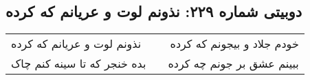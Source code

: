 \begin{center}
\section*{دوبیتی شماره ۲۲۹: نذونم لوت و عریانم که کرده}
\label{sec:229}
\begin{longtable}{l p{0.5cm} r}
نذونم لوت و عریانم که کرده
&&
خودم جلاد و بیجونم که کرده
\\
بده خنجر که تا سینه کنم چاک
&&
ببینم عشق بر جونم چه کرده
\\
\end{longtable}
\end{center}
